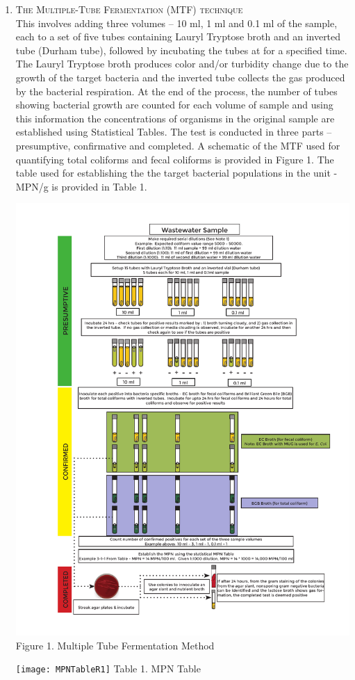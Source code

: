 \begin{enumerate}
\item \noindent\textsc{The Multiple-Tube Fermentation (MTF) technique}\\
This involves adding three volumes – 10 ml, 1 ml and 0.1 ml of the sample, each to a set of five tubes containing Lauryl Tryptose broth and an inverted tube (Durham tube), followed by incubating the tubes at  for a specified time.  The Lauryl Tryptose broth produces color and/or turbidity change due to the growth of the target bacteria and the inverted tube collects the gas produced by the bacterial respiration.  At the end of the process, the number of tubes showing bacterial growth are counted for each volume of sample and using this information the concentrations of organisms in the original sample are established using Statistical Tables.  The test is conducted in three parts – presumptive, confirmative and completed.  A schematic of the MTF used for quantifying total coliforms and fecal coliforms is provided in Figure 1.  The table used for establishing the the target bacterial populations in the unit - MPN/g is provided in Table 1.\\
\newpage
\begin{center}
\includegraphics[scale=0.78]{MTF}
Figure 1.  Multiple Tube Fermentation Method
\end{center}
\newpage
\begin{center}
\texttt{[image: MPNTableR1]}
Table 1.  MPN Table
\end{center}
\vspace{1cm}
\newpage


\end{enumerate}
